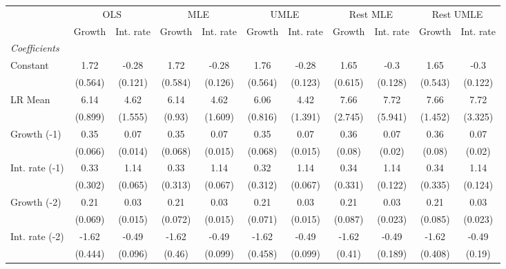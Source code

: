 \begin{table}[htbp] 
	\centering
	\begin{tabular}{@{\extracolsep{4pt}}lcccccccccc@{}}		\hline\hline
		 		 & \multicolumn{2}{c}{OLS} &\multicolumn{2}{c}{MLE} &\multicolumn{2}{c}{UMLE} &\multicolumn{2}{c}{Rest MLE} &\multicolumn{2}{c}{Rest UMLE} \\ 
 		 & Growth 	 & Int. rate 	 & Growth 	 & Int. rate 	 & Growth 	 & Int. rate 	 & Growth 	 & Int. rate 	 & Growth 	 & Int. rate\\\cline{2-3}\cline{4-5}\cline{6-7}\cline{8-9}\cline{10-11}
\rule{0pt}{4ex} 
 \emph{Coefficients} 	  		 & 		 & 		 & 		 & 		 & 		 & 		 & 		 & 		 & 		 &\\ 
\quad Constant 	 & 1.72 	 & -0.28 	 & 1.72 	 & -0.28 	 & 1.76 	 & -0.28 	 & 1.65 	 & -0.3 	 & 1.65 	 & -0.3	 \\ 
 		 & (0.564) 	 & (0.121) 	 & (0.584) 	 & (0.126) 	 & (0.564) 	 & (0.123) 	 & (0.615) 	 & (0.128) 	 & (0.543) 	 & (0.122) 	 \\ 
\quad LR Mean 	 & 6.14 	 & 4.62 	 & 6.14 	 & 4.62 	 & 6.06 	 & 4.42 	 & 7.66 	 & 7.72 	 & 7.66 	 & 7.72	 \\ 
 		 & (0.899) 	 & (1.555) 	 & (0.93) 	 & (1.609) 	 & (0.816) 	 & (1.391) 	 & (2.745) 	 & (5.941) 	 & (1.452) 	 & (3.325) 	 \\ 
\quad Growth (-1) 	 &0.35 	 & 0.07 	 & 0.35 	 & 0.07 	 & 0.35 	 & 0.07 	 & 0.36 	 & 0.07 	 & 0.36 	 & 0.07	 \\ 
 		 & (0.066) 	 & (0.014) 	 & (0.068) 	 & (0.015) 	 & (0.068) 	 & (0.015) 	 & (0.08) 	 & (0.02) 	 & (0.08) 	 & (0.02) 	 \\ 
\quad Int. rate (-1) 	 &0.33 	 & 1.14 	 & 0.33 	 & 1.14 	 & 0.32 	 & 1.14 	 & 0.34 	 & 1.14 	 & 0.34 	 & 1.14	 \\ 
 		 & (0.302) 	 & (0.065) 	 & (0.313) 	 & (0.067) 	 & (0.312) 	 & (0.067) 	 & (0.331) 	 & (0.122) 	 & (0.335) 	 & (0.124) 	 \\ 
\quad Growth (-2) 	 &0.21 	 & 0.03 	 & 0.21 	 & 0.03 	 & 0.21 	 & 0.03 	 & 0.21 	 & 0.03 	 & 0.21 	 & 0.03	 \\ 
 		 & (0.069) 	 & (0.015) 	 & (0.072) 	 & (0.015) 	 & (0.071) 	 & (0.015) 	 & (0.087) 	 & (0.023) 	 & (0.085) 	 & (0.023) 	 \\ 
\quad Int. rate (-2) 	 &-1.62 	 & -0.49 	 & -1.62 	 & -0.49 	 & -1.62 	 & -0.49 	 & -1.62 	 & -0.49 	 & -1.62 	 & -0.49	 \\ 
 		 & (0.444) 	 & (0.096) 	 & (0.46) 	 & (0.099) 	 & (0.458) 	 & (0.099) 	 & (0.41) 	 & (0.189) 	 & (0.408) 	 & (0.19) 	 \\ 

\end{tabular}
\end{table}
